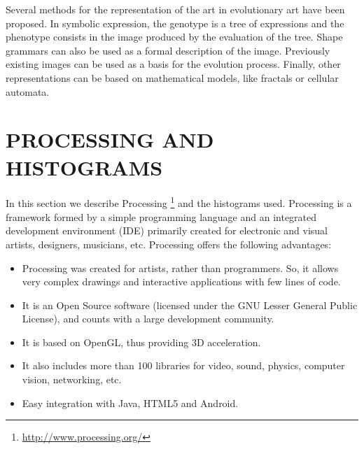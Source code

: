 \documentclass[a4paper,twoside]{article}
\begin{document}
Several methods for the representation of the art in evolutionary art have been proposed. In symbolic expression, the genotype is a tree of expressions and the phenotype consists in the image produced  by the evaluation of the tree. Shape grammars can also be used as a formal description of the image. Previously existing images can be used as a basis for the evolution process. Finally, other representations can be based on mathematical models, like fractals or cellular automata.




\section{PROCESSING AND HISTOGRAMS}
\label{sec:processing}
\noindent In this section we describe Processing \footnote{\url{http://www.processing.org/}} and the histograms used. Processing \cite{PROCESSING} is a framework formed by a simple programming language and an integrated development environment (IDE) primarily created for electronic and visual artists, designers, musicians, etc. Processing offers the following advantages:

\begin{itemize}
\item Processing was created for artists, rather than programmers. So, it allows very complex drawings and interactive applications with few lines of code.
\item It is an Open Source software (licensed under the GNU Lesser General Public License), and counts with a large development community.
\item It is based on OpenGL, thus providing 3D acceleration.
\item It also includes more than 100 libraries for video, sound, physics, computer vision, networking, etc.
\item Easy integration with Java, HTML5 and Android.
\end{itemize}



\end{document}
